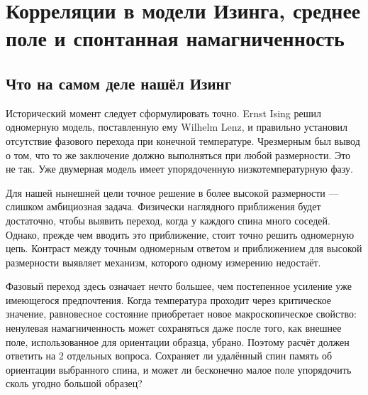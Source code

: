 \chapter{Корреляции в модели Изинга, среднее поле и спонтанная намагниченность}


\section{Что на самом деле нашёл Изинг}

Исторический момент следует сформулировать точно. Ernst Ising решил одномерную модель, поставленную ему Wilhelm Lenz, и правильно установил отсутствие фазового перехода при конечной температуре. Чрезмерным был вывод о том, что то же заключение должно выполняться при любой размерности. Это не так. Уже двумерная модель имеет упорядоченную низкотемпературную фазу.

Для нашей нынешней цели точное решение в более высокой размерности — слишком амбициозная задача. Физически наглядного приближения будет достаточно, чтобы выявить переход, когда у каждого спина много соседей. Однако, прежде чем вводить это приближение, стоит точно решить одномерную цепь. Контраст между точным одномерным ответом и приближением для высокой размерности выявляет механизм, которого одному измерению недостаёт.

Фазовый переход здесь означает нечто большее, чем постепенное усиление уже имеющегося предпочтения. Когда температура проходит через критическое значение, равновесное состояние приобретает новое макроскопическое свойство: ненулевая намагниченность может сохраняться даже после того, как внешнее поле, использованное для ориентации образца, убрано. Поэтому расчёт должен ответить на 2 отдельных вопроса. Сохраняет ли удалённый спин память об ориентации выбранного спина, и может ли бесконечно малое поле упорядочить сколь угодно большой образец?


